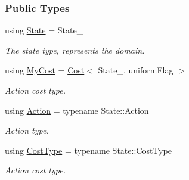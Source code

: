 \subsubsection*{Public Types}
\begin{DoxyCompactItemize}
\item 
using \hyperlink{structslb_1_1core_1_1sb_1_1ActionNeighbor_a02ad426b9f967a4dee5110053cd9c102}{State} = State\+\_\+\hypertarget{structslb_1_1core_1_1sb_1_1ActionNeighbor_a02ad426b9f967a4dee5110053cd9c102}{}\label{structslb_1_1core_1_1sb_1_1ActionNeighbor_a02ad426b9f967a4dee5110053cd9c102}

\begin{DoxyCompactList}\small\item\em The state type, represents the domain. \end{DoxyCompactList}\item 
using \hyperlink{structslb_1_1core_1_1sb_1_1ActionNeighbor_a6fcd3cfd6ae478c9a4751b051d2c01bd}{My\+Cost} = \hyperlink{structslb_1_1core_1_1sb_1_1Cost}{Cost}$<$ State\+\_\+, uniform\+Flag $>$\hypertarget{structslb_1_1core_1_1sb_1_1ActionNeighbor_a6fcd3cfd6ae478c9a4751b051d2c01bd}{}\label{structslb_1_1core_1_1sb_1_1ActionNeighbor_a6fcd3cfd6ae478c9a4751b051d2c01bd}

\begin{DoxyCompactList}\small\item\em Action cost type. \end{DoxyCompactList}\item 
using \hyperlink{structslb_1_1core_1_1sb_1_1ActionNeighbor_ae3ea9c18fb03dec73db239df85a86e57}{Action} = typename State\+::\+Action\hypertarget{structslb_1_1core_1_1sb_1_1ActionNeighbor_ae3ea9c18fb03dec73db239df85a86e57}{}\label{structslb_1_1core_1_1sb_1_1ActionNeighbor_ae3ea9c18fb03dec73db239df85a86e57}

\begin{DoxyCompactList}\small\item\em Action type. \end{DoxyCompactList}\item 
using \hyperlink{structslb_1_1core_1_1sb_1_1ActionNeighbor_a9e6b78876ab123703e20855fe79d6855}{Cost\+Type} = typename State\+::\+Cost\+Type\hypertarget{structslb_1_1core_1_1sb_1_1ActionNeighbor_a9e6b78876ab123703e20855fe79d6855}{}\label{structslb_1_1core_1_1sb_1_1ActionNeighbor_a9e6b78876ab123703e20855fe79d6855}

\begin{DoxyCompactList}\small\item\em Action cost type. \end{DoxyCompactList}\end{DoxyCompactItemize}
